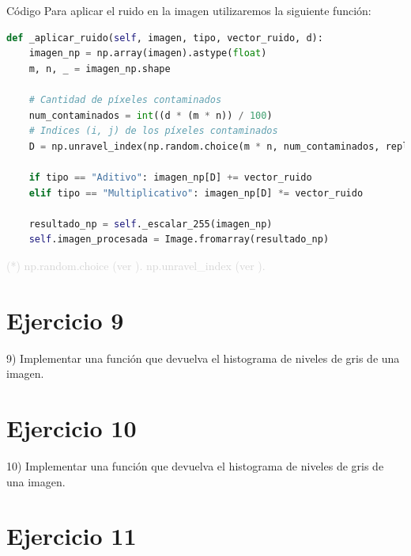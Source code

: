 \documentclass{beamer}
\begin{document}
\begin{frame}[fragile]{Código}
	\justifying
	Para aplicar el ruido en la imagen utilizaremos la siguiente función:
	
	\begin{lstlisting}[language=Python]
def _aplicar_ruido(self, imagen, tipo, vector_ruido, d):
	imagen_np = np.array(imagen).astype(float)
	m, n, _ = imagen_np.shape
	
	# Cantidad de píxeles contaminados
	num_contaminados = int((d * (m * n)) / 100)
	# Indices (i, j) de los píxeles contaminados
	D = np.unravel_index(np.random.choice(m * n, num_contaminados, replace=False),(m, n))
	
	if tipo == "Aditivo": imagen_np[D] += vector_ruido
	elif tipo == "Multiplicativo": imagen_np[D] *= vector_ruido
	
	resultado_np = self._escalar_255(imagen_np)
	self.imagen_procesada = Image.fromarray(resultado_np)
	\end{lstlisting}
	
	\vfill
	\footnotesize \textcolor{lightgray}{(*) np.random.choice (ver \cite{numpy-random.choice}). np.unravel\_index (ver \cite{numpy-unravel-index}).}
\end{frame}

\section{Ejercicio 9}

\begin{frame}
	\begin{center}
		9) Implementar una función que devuelva el histograma de niveles de gris de una imagen.
	\end{center}
\end{frame}

\section{Ejercicio 10}

\begin{frame}
	\begin{center}
		10) Implementar una función que devuelva el histograma de niveles de gris de una imagen.
	\end{center}
\end{frame}

\section{Ejercicio 11}
\end{document}
